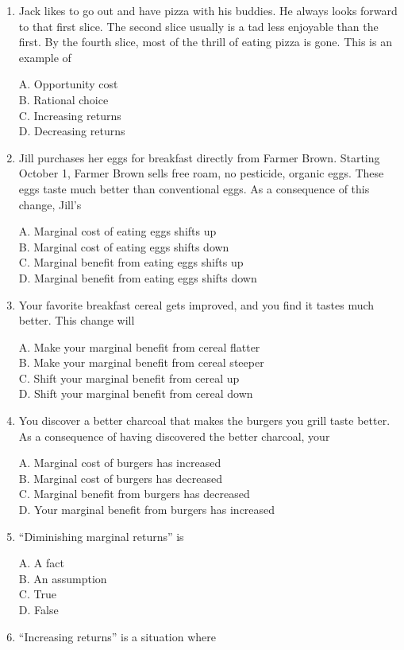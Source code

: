 \documentclass[
]{book}
\begin{document}
\begin{enumerate}
\def\labelenumi{\arabic{enumi}.}
\item
  Jack likes to go out and have pizza with his buddies. He always looks forward to that first slice. The second slice usually is a tad less enjoyable than the first. By the fourth slice, most of the thrill of eating pizza is gone. This is an example of

  A. Opportunity cost\\
  B. Rational choice\\
  C. Increasing returns\\
  D. Decreasing returns
\item
  Jill purchases her eggs for breakfast directly from Farmer Brown. Starting October 1, Farmer Brown sells free roam, no pesticide, organic eggs. These eggs taste much better than conventional eggs. As a consequence of this change, Jill's

  A. Marginal cost of eating eggs shifts up\\
  B. Marginal cost of eating eggs shifts down\\
  C. Marginal benefit from eating eggs shifts up\\
  D. Marginal benefit from eating eggs shifts down
\item
  Your favorite breakfast cereal gets improved, and you find it tastes much better. This change will

  A. Make your marginal benefit from cereal flatter\\
  B. Make your marginal benefit from cereal steeper\\
  C. Shift your marginal benefit from cereal up\\
  D. Shift your marginal benefit from cereal down
\item
  You discover a better charcoal that makes the burgers you grill taste better. As a consequence of having discovered the better charcoal, your

  A. Marginal cost of burgers has increased\\
  B. Marginal cost of burgers has decreased\\
  C. Marginal benefit from burgers has decreased\\
  D. Your marginal benefit from burgers has increased
\item
  ``Diminishing marginal returns'' is

  A. A fact\\
  B. An assumption\\
  C. True\\
  D. False
\item
  ``Increasing returns'' is a situation where


\end{enumerate}
\end{document}
